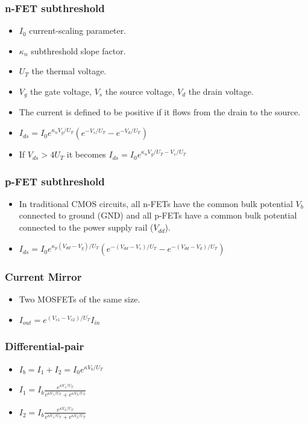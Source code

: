 \documentclass[a4paper, 12pt]{article}
\begin{document}
\subsubsection{n-FET subthreshold}
\begin{itemize}[noitemsep,nolistsep]
	\item $I_0$ current-scaling parameter.
	\item $\kappa_n$ subthreshold slope factor.
	\item $U_T$ the thermal voltage.
	\item $V_g$ the gate voltage, $V_s$ the source voltage, $V_d$ the drain voltage.
	\item The current is defined to be positive if it flows from the drain to the source.
	\item $I_{ds} = I_0e^{\kappa_nV_g/U_T}(e^{-V_s/U_T}-e^{-V_d/U_T})$
	\item If $V_{ds} > 4U_T$ it becomes $I_{ds} = I_0e^{\kappa_nV_g/U_T-V_s/U_T}$
\end{itemize}

\subsubsection{p-FET subthreshold}
\begin{itemize}[noitemsep,nolistsep]
	\item In traditional CMOS circuits, all n-FETs have the common bulk potential $V_b$ connected to ground (GND) and all p-FETs have a common bulk potential connected to the power supply rail ($V_{dd}$).
	\item $I_{ds}=I_0e^{\kappa_p(V_{dd}-V_g)/U_T}(e^{-(V_{dd}-V_s)/U_T}-e^{-(V_{dd}-V_d)/U_T})$
\end{itemize}

\subsubsection{Current Mirror}
\begin{itemize}[noitemsep,nolistsep]
	\item Two MOSFETs of the same size.
	\item $I_{out}=e^{(V_{s1}-V_{s2})/U_T}I_{in}$
\end{itemize}

\subsubsection{Differential-pair}
\begin{itemize}[noitemsep,nolistsep]
	\item $I_b=I_1+I_2=I_0e^{\kappa V_b/U_T}$
	\item $I_1=I_b\frac{e^{\kappa V_1/U_T}}{e^{\kappa V_1/U_T}+e^{\kappa V_2/U_T}}$
	\item $I_2=I_b\frac{e^{\kappa V_2/U_T}}{e^{\kappa V_1/U_T}+e^{\kappa V_2/U_T}}$
\end{itemize}
\end{document}
